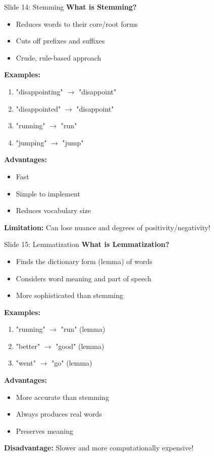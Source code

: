 \documentclass[8pt]{beamer}
\begin{document}
	\begin{frame}{Slide 14: Stemming}
		\fontsize{6.5}{7.5}\selectfont
		\textbf{What is Stemming?}
		\begin{itemize}
			\item Reduces words to their core/root forms
			\item Cuts off prefixes and suffixes
			\item Crude, rule-based approach
		\end{itemize}
		
		\vspace{0.1cm}
		\textbf{Examples:}
		\begin{enumerate}
			\item "disappointing" $\to$ "disappoint"
			\item "disappointed" $\to$ "disappoint"
			\item "running" $\to$ "run"
			\item "jumping" $\to$ "jump"
		\end{enumerate}
		
		\vspace{0.1cm}
		\textbf{Advantages:}
		\begin{itemize}
			\item Fast
			\item Simple to implement
			\item Reduces vocabulary size
		\end{itemize}
		
		\textcolor{myblue}{\textbf{Limitation:}} Can lose nuance and degrees of positivity/negativity!
	\end{frame}
	
	\begin{frame}{Slide 15: Lemmatization}
		\fontsize{6.5}{7.5}\selectfont
		\textbf{What is Lemmatization?}
		\begin{itemize}
			\item Finds the dictionary form (lemma) of words
			\item Considers word meaning and part of speech
			\item More sophisticated than stemming
		\end{itemize}
		
		\vspace{0.1cm}
		\textbf{Examples:}
		\begin{enumerate}
			\item "running" $\to$ "run" (lemma)
			\item "better" $\to$ "good" (lemma)
			\item "went" $\to$ "go" (lemma)
		\end{enumerate}
		
		\vspace{0.1cm}
		\textbf{Advantages:}
		\begin{itemize}
			\item More accurate than stemming
			\item Always produces real words
			\item Preserves meaning
		\end{itemize}
		
		\textcolor{myblue}{\textbf{Disadvantage:}} Slower and more computationally expensive!
	\end{frame}
	
\end{document}
